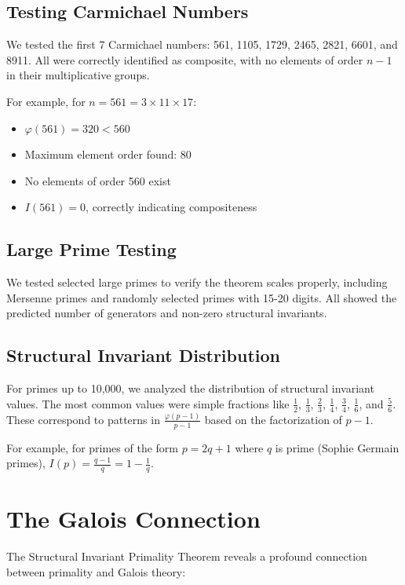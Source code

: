 \documentclass[11pt,a4paper]{article}
\newcommand{\totient}{\varphi}
\newcommand{\structinv}{I}
\begin{document}
\subsection{Testing Carmichael Numbers}

We tested the first 7 Carmichael numbers: 561, 1105, 1729, 2465, 2821, 6601, and 8911. All were correctly identified as composite, with no elements of order $n-1$ in their multiplicative groups.

For example, for $n = 561 = 3 \times 11 \times 17$:
\begin{itemize}
    \item $\totient(561) = 320 < 560$
    \item Maximum element order found: 80
    \item No elements of order 560 exist
    \item $\structinv(561) = 0$, correctly indicating compositeness
\end{itemize}

\subsection{Large Prime Testing}

We tested selected large primes to verify the theorem scales properly, including Mersenne primes and randomly selected primes with 15-20 digits. All showed the predicted number of generators and non-zero structural invariants.

\subsection{Structural Invariant Distribution}

For primes up to 10,000, we analyzed the distribution of structural invariant values. The most common values were simple fractions like $\frac{1}{2}$, $\frac{1}{3}$, $\frac{2}{3}$, $\frac{1}{4}$, $\frac{3}{4}$, $\frac{1}{6}$, and $\frac{5}{6}$. These correspond to patterns in $\frac{\totient(p-1)}{p-1}$ based on the factorization of $p-1$.

For example, for primes of the form $p = 2q+1$ where $q$ is prime (Sophie Germain primes), $\structinv(p) = \frac{q-1}{q} = 1-\frac{1}{q}$.

\section{The Galois Connection}

The Structural Invariant Primality Theorem reveals a profound connection between primality and Galois theory:
\end{document}

